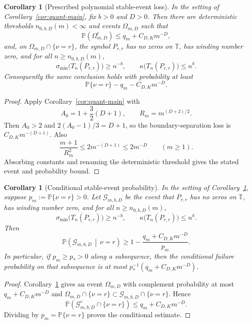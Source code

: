 \documentclass[11pt]{amsart}
\numberwithin{equation}{section}
\newtheorem{corollary}[theorem]{Corollary}
\theoremstyle{definition}
\theoremstyle{remark}
\newcommand{\T}{\mathbb T}
\newcommand{\Prob}{\mathbb P}
\newcommand{\smin}{\sigma_{\min}}
\newcommand{\kdn}{\kappa}
\begin{document}
\begin{corollary}[Prescribed polynomial stable-event loss]
\label{cor:quant-main-polynomial-loss}
In the setting of Corollary~\ref{cor:quant-main}, fix \(b>0\) and \(D>0\).
Then there are deterministic thresholds \(n_{0,b,D}(m)<\infty\) and events
\(\Omega_{m,D}\) such that
\[
  \Prob(\Omega_{m,D}^c)\le q_m+C_{D,K}m^{-D},
\]
and, on \(\Omega_{m,D}\cap\{\nu=r\}\), the symbol \(P_{r,r}\) has no zeros on
\(\T\), has winding number zero, and for all \(n\ge n_{0,b,D}(m)\),
\[
  \smin\bigl(T_n(P_{r,r})\bigr)\ge n^{-b},
  \qquad
  \kdn\bigl(T_n(P_{r,r})\bigr)\le n^b .
\]
Consequently the same conclusion holds with probability at least
\[
  \Prob\{\nu=r\}-q_m-C_{D,K}m^{-D}.
\]
\end{corollary}

\begin{proof}
Apply Corollary~\ref{cor:quant-main} with
\[
  A_0=1+\frac32(D+1),\qquad R_m=m^{(D+2)/2}.
\]
Then \(A_0>2\) and \(2(A_0-1)/3=D+1\), so the boundary-separation loss is
\(C_{D,K}m^{-(D+1)}\).  Also
\[
  \frac{m+1}{R_m^2}\le 2m^{-(D+1)}\le 2m^{-D}\qquad(m\ge1).
\]
Absorbing constants and renaming the deterministic threshold gives the stated
event and probability bound.
\end{proof}

\begin{corollary}[Conditional stable-event probability]
\label{cor:quant-main-conditional}
In the setting of Corollary~\ref{cor:quant-main-polynomial-loss}, suppose
\(p_m:=\Prob\{\nu=r\}>0\).  Let \(\mathcal G_{m,b,D}\) be the event that
\(P_{r,r}\) has no zeros on \(\T\), has winding number zero, and for all
\(n\ge n_{0,b,D}(m)\),
\[
  \smin\bigl(T_n(P_{r,r})\bigr)\ge n^{-b},
  \qquad
  \kdn\bigl(T_n(P_{r,r})\bigr)\le n^b .
\]
Then
\[
  \Prob\left(\mathcal G_{m,b,D}\,\middle|\,\nu=r\right)
  \ge 1-\frac{q_m+C_{D,K}m^{-D}}{p_m}.
\]
In particular, if \(p_m\ge p_*>0\) along a subsequence, then the conditional
failure probability on that subsequence is at most
\(p_*^{-1}(q_m+C_{D,K}m^{-D})\).
\end{corollary}

\begin{proof}
Corollary~\ref{cor:quant-main-polynomial-loss} gives an event
\(\Omega_{m,D}\) with complement probability at most \(q_m+C_{D,K}m^{-D}\) and
\(\Omega_{m,D}\cap\{\nu=r\}\subset\mathcal G_{m,b,D}\cap\{\nu=r\}\).  Hence
\[
  \Prob\left(\mathcal G_{m,b,D}^c\cap\{\nu=r\}\right)
  \le q_m+C_{D,K}m^{-D}.
\]
Dividing by \(p_m=\Prob\{\nu=r\}\) proves the conditional estimate.
\end{proof}
\end{document}
